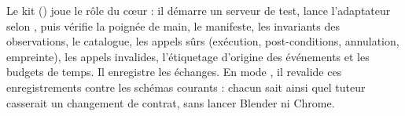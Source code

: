 Le kit () joue le rôle du cœur : il démarre un serveur de test, lance l'adaptateur selon , puis vérifie la poignée de main, le manifeste, les invariants des observations, le catalogue, les appels sûrs (exécution, post-conditions, annulation, empreinte), les appels invalides, l'étiquetage d'origine des événements et les budgets de temps. Il enregistre les échanges. En mode , il revalide ces enregistrements contre les schémas courants : chacun sait ainsi quel tuteur casserait un changement de contrat, sans lancer Blender ni Chrome.



